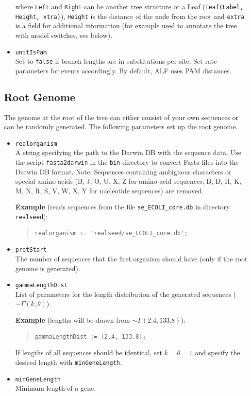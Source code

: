 \documentclass[11pt]{article}
\begin{document}
\begin{itemize}
\noindent where \texttt{Left} and \texttt{Right} can be another tree structure or a Leaf (\texttt{Leaf(Label, Height, xtra)}), \texttt{Height} is the distance of the node from the root and \texttt{extra} is a field for additional information (for example used to annotate the tree with model switches, see below).

\item{\texttt{unitIsPam}} \hfill \\
Set to \texttt{false} if branch lengths are in substitutions per site. Set rate parameters for events accordingly. By default, ALF uses PAM distances.
\end{itemize}

\subsection{Root Genome}
The genome at the root of the tree can either consist of your own sequences or can be randomly generated. The following parameters set up the root genome.
\begin{itemize}
\item{\texttt{realorganism}} \hfill \\
 A string specifying the path to the Darwin DB with the sequence data. Use the script \texttt{fasta2darwin} in the \texttt{bin} directory to convert Fasta files into the Darwin DB format. Note: Sequences containing ambiguous characters or special amino acids (B, J, O, U, X, Z for amino acid sequences; B, D, H, K, M, N, R, S, V, W, X, Y for nucleotide sequences) are removed.

\noindent \textbf{Example} (reads sequences from the file \texttt{se\_ECOLI\_core.db} in directory \texttt{realseed}):
\begin{quote}
\begin{verbatim}
realorganism := 'realseed/se_ECOLI_core.db';
\end{verbatim}
\end{quote}
\item{\texttt{protStart}} \hfill \\
The number of sequences that the first organism should have (only if the root genome is generated).
\item{\texttt{gammaLengthDist}} \hfill \\
List of parameters for the length distribution of the generated sequences ($\sim\Gamma(k,\theta)$). 

\noindent \textbf{Example} (lengths will be drawn from $\sim\Gamma(2.4,133.8)$):
\begin{quote}
\begin{verbatim}
gammaLengthDist := [2.4, 133.8];
\end{verbatim}
\end{quote}
If lengths of all sequences should be identical, set $k=\theta=1$ and specify the desired length with \texttt{minGeneLength}.

\item{\texttt{minGeneLength}} \hfill \\
Minimum length of a gene.
\end{itemize}
\end{document}
